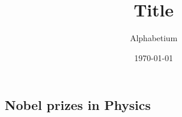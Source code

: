 \documentclass[12pt, a4paper, oneside]{article}
\title{Title}
\date{\today}
\author{Alphabetium}
\begin{document}
\begin{spacing}{2.0}
\maketitle


\section{Nobel prizes in Physics}

\end{spacing}{}



\end{document}
